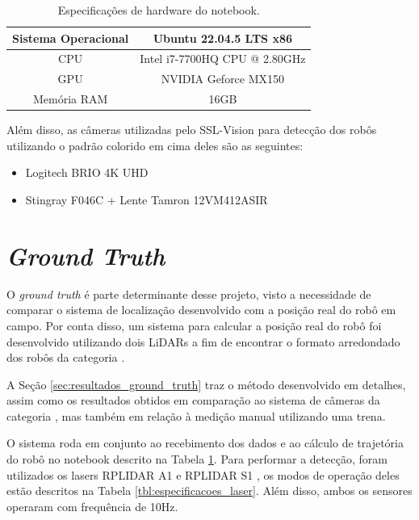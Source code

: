 \documentclass[acronym, symbols, table]{fei}
\begin{document}
		\begin{table}[!htb]
			\centering
			\caption{Especificações de hardware do notebook.}
			\label{tbl:especificacoes_notebook}
			\begin{tabular}{c c}
				\hline
				Sistema Operacional & Ubuntu 22.04.5 LTS x86\textunderscore64  \\ \hline
				CPU 				& Intel i7-7700HQ CPU @ 2.80GHz \\ \hline
				GPU 				& NVIDIA Geforce MX150 \\ \hline
				Memória RAM			& 16GB \\ \hline
			\end{tabular}
		\end{table}
	
		Além disso, as câmeras utilizadas pelo SSL-Vision para detecção dos robôs utilizando o padrão colorido em cima deles são as seguintes:
		
		\begin{itemize}
			\item Logitech BRIO 4K UHD \cite{logitech_brio}
			\item Stingray F046C \cite{stingray_f046c} + Lente Tamron 12VM412ASIR
		\end{itemize}
	
	\section{\textit{Ground Truth}}\label{sec:metodologia_ground_truth}
	
	O \textit{ground truth} é parte determinante desse projeto, visto a necessidade de comparar o sistema de localização desenvolvido com a posição real do robô em campo. Por conta disso, um sistema para calcular a posição real do robô foi desenvolvido utilizando dois LiDARs a fim de encontrar o formato arredondado dos robôs da categoria .
	
	A Seção \ref{sec:resultados_ground_truth} traz o método desenvolvido em detalhes, assim como os resultados obtidos em comparação ao sistema de câmeras da categoria , mas também em relação à medição manual utilizando uma trena.
	
	O sistema roda em conjunto ao recebimento dos dados e ao cálculo de trajetória do robô no notebook descrito na Tabela \ref{tbl:especificacoes_notebook}. Para performar a detecção, foram utilizados os lasers RPLIDAR A1 \cite{rplidar_a1} e RPLIDAR S1 \cite{rplidar_s1}, os modos de operação deles estão descritos na Tabela \ref{tbl:especificacoes_laser}. Além disso, ambos os sensores operaram com frequência de 10Hz.
	
\end{document}
